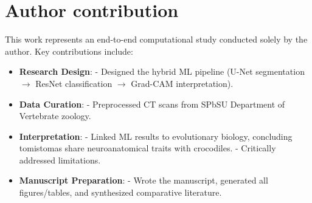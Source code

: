 \chapter{Author contribution}
This work represents an end-to-end computational study conducted solely by the author. Key contributions include:  

\begin{itemize}  
    \item \textbf{Research Design}:   
    - Designed the hybrid ML pipeline (U-Net segmentation $\rightarrow$ ResNet classification $\rightarrow$ Grad-CAM interpretation).  

    \item \textbf{Data Curation}:  
    - Preprocessed CT scans from SPbSU Department of Vertebrate zoology.  

    \item \textbf{Interpretation}:  
    - Linked ML results to evolutionary biology, concluding tomistomas share neuroanatomical traits with crocodiles.  
    - Critically addressed limitations.  

    \item \textbf{Manuscript Preparation}:  
    - Wrote the manuscript, generated all figures/tables, and synthesized comparative literature.  
\end{itemize} 